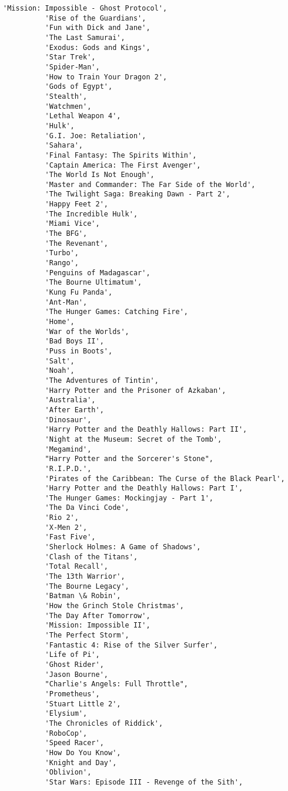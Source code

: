 \documentclass[11pt]{article}
\begin{document}
\begin{Verbatim}[commandchars=\\\{\}]
          'Mission: Impossible - Ghost Protocol',
          'Rise of the Guardians',
          'Fun with Dick and Jane',
          'The Last Samurai',
          'Exodus: Gods and Kings',
          'Star Trek',
          'Spider-Man',
          'How to Train Your Dragon 2',
          'Gods of Egypt',
          'Stealth',
          'Watchmen',
          'Lethal Weapon 4',
          'Hulk',
          'G.I. Joe: Retaliation',
          'Sahara',
          'Final Fantasy: The Spirits Within',
          'Captain America: The First Avenger',
          'The World Is Not Enough',
          'Master and Commander: The Far Side of the World',
          'The Twilight Saga: Breaking Dawn - Part 2',
          'Happy Feet 2',
          'The Incredible Hulk',
          'Miami Vice',
          'The BFG',
          'The Revenant',
          'Turbo',
          'Rango',
          'Penguins of Madagascar',
          'The Bourne Ultimatum',
          'Kung Fu Panda',
          'Ant-Man',
          'The Hunger Games: Catching Fire',
          'Home',
          'War of the Worlds',
          'Bad Boys II',
          'Puss in Boots',
          'Salt',
          'Noah',
          'The Adventures of Tintin',
          'Harry Potter and the Prisoner of Azkaban',
          'Australia',
          'After Earth',
          'Dinosaur',
          'Harry Potter and the Deathly Hallows: Part II',
          'Night at the Museum: Secret of the Tomb',
          'Megamind',
          "Harry Potter and the Sorcerer's Stone",
          'R.I.P.D.',
          'Pirates of the Caribbean: The Curse of the Black Pearl',
          'Harry Potter and the Deathly Hallows: Part I',
          'The Hunger Games: Mockingjay - Part 1',
          'The Da Vinci Code',
          'Rio 2',
          'X-Men 2',
          'Fast Five',
          'Sherlock Holmes: A Game of Shadows',
          'Clash of the Titans',
          'Total Recall',
          'The 13th Warrior',
          'The Bourne Legacy',
          'Batman \& Robin',
          'How the Grinch Stole Christmas',
          'The Day After Tomorrow',
          'Mission: Impossible II',
          'The Perfect Storm',
          'Fantastic 4: Rise of the Silver Surfer',
          'Life of Pi',
          'Ghost Rider',
          'Jason Bourne',
          "Charlie's Angels: Full Throttle",
          'Prometheus',
          'Stuart Little 2',
          'Elysium',
          'The Chronicles of Riddick',
          'RoboCop',
          'Speed Racer',
          'How Do You Know',
          'Knight and Day',
          'Oblivion',
          'Star Wars: Episode III - Revenge of the Sith',

\end{Verbatim}
\end{document}
